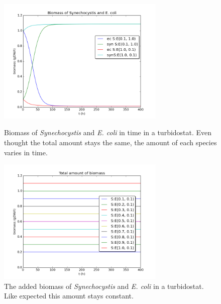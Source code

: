 \documentclass[12pt]{report}
\begin{document}
\begin{figure}[htbp]
  \hfill
  \begin{minipage}[t]{.45\textwidth}
 \begin{center}  
     \includegraphics[width=8cm]{sub_dependent_turb_biomassex.png}
     \caption{Biomass of \textit{Synechocystis} and \textit{E. coli} in time in a turbidostat. Even thought the total amount stays the same, the amount of each species varies in time.}
    \label{fig:subturbbex}
    \end{center}
  \end{minipage}
  \hfill
  \begin{minipage}[t]{.45\textwidth}
    \begin{center}  
     \includegraphics[width=8cm]{total_biomass1.png}
     \caption{The added biomass of \textit{Synechocystis} and \textit{E. coli} in a turbidostat. Like expected this amount stays constant.}
    \label{fig:subturbtb}
    \end{center}
  \end{minipage}
  \hfill
\end{figure}

\end{document}

